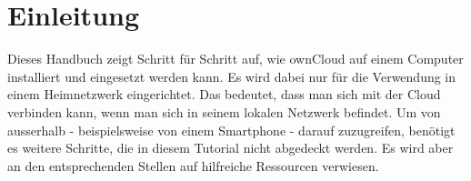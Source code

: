 \section{Einleitung}
Dieses Handbuch zeigt Schritt für Schritt auf, wie ownCloud auf einem Computer installiert und eingesetzt werden kann.
Es wird dabei nur für die Verwendung in einem Heimnetzwerk eingerichtet. Das bedeutet, dass man sich mit der Cloud verbinden kann, wenn man sich in seinem lokalen Netzwerk befindet. Um von ausserhalb - beispielsweise von einem Smartphone - darauf zuzugreifen, benötigt es weitere Schritte, die in diesem Tutorial nicht abgedeckt werden. Es wird aber an den entsprechenden Stellen auf hilfreiche Ressourcen verwiesen.


